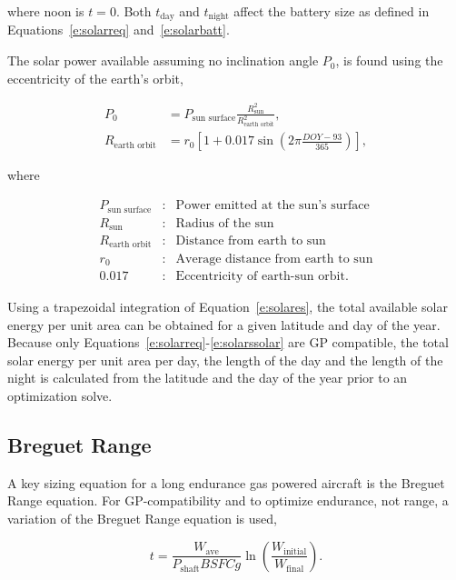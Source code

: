 \documentclass[]{aiaa-tc}%
\begin{document}
    where noon is $t=0$. Both $t_{\text{day}}$ and $t_{\text{night}}$ affect the battery size as defined in Equations~\eqref{e:solarreq} and~\eqref{e:solarbatt}. 

    The solar power available assuming no inclination angle $P_0$, is found using the eccentricity of the earth's orbit, 

    \begin{align}
        \label{e:solarp0}
        P_0 & = P_{\text{sun surface}} \frac{R_{\text{sun}}^2}{R_{\text{earth orbit}}^2}, \\
        \label{e:solareo}
        R_{\text{earth orbit}} & = r_0 \left[ 1 + 0.017 \sin{\left( 2\pi \frac{DOY-93}{365}\right)} \right],
    \end{align}
    
    where 

    \[ \begin{array}{lcl}
        P_{\text{sun surface}} & : & \text{Power emitted at the sun's surface} \\
        R_{\text{sun}} & : & \text{Radius of the sun} \\
        R_{\text{earth orbit}} & : & \text{Distance from earth to sun} \\
        r_0 & : & \text{Average distance from earth to sun} \\
        0.017 & : & \text{Eccentricity of earth-sun orbit}.
    \end{array} \]

    Using a trapezoidal integration of Equation~\eqref{e:solares}, the total available solar energy per unit area can be obtained for a given latitude and day of the year. Because only Equations~\eqref{e:solarreq}-\eqref{e:solarssolar} are GP compatible, the total solar energy per unit area per day, the length of the day and the length of the night is calculated from the latitude and the day of the year prior to an optimization solve.

\subsection{Breguet Range}

A key sizing equation for a long endurance gas powered aircraft is the Breguet Range equation.  
For GP-compatibility and to optimize endurance, not range, a variation of the Breguet Range equation is used, 

\begin{equation}
    \label{e:breguetendurance}
    t = \frac{W_{\text{ave}}}{P_{\text{shaft}}BSFCg} \ln{\left( \frac{W_{\text{initial}}}{W_{\text{final}}}\right)}.
\end{equation}
\end{document}
